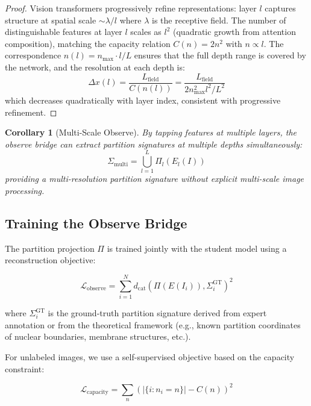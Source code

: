 \documentclass[11pt,twocolumn,a4paper]{article}
\newtheorem{corollary}[theorem]{Corollary}
\theoremstyle{definition}
\theoremstyle{remark}
\newcommand{\dcat}{d_{\mathrm{cat}}}
\newcommand{\Sig}{\Sigma}
\newcommand{\loss}{\mathcal{L}}
\begin{document}
\begin{proof}
Vision transformers progressively refine representations: layer $l$ captures structure at spatial scale $\sim \lambda / l$ where $\lambda$ is the receptive field. The number of distinguishable features at layer $l$ scales as $l^2$ (quadratic growth from attention composition), matching the capacity relation $C(n) = 2n^2$ with $n \propto l$. The correspondence $n(l) = n_{\max} \cdot l/L$ ensures that the full depth range is covered by the network, and the resolution at each depth is:
\begin{equation}
\Delta x(l) = \frac{L_{\text{field}}}{C(n(l))} = \frac{L_{\text{field}}}{2n_{\max}^2 l^2 / L^2}
\end{equation}
which decreases quadratically with layer index, consistent with progressive refinement.
\end{proof}

\begin{corollary}[Multi-Scale Observe]
By tapping features at multiple layers, the observe bridge can extract partition signatures at multiple depths simultaneously:
\begin{equation}
\Sig_{\text{multi}} = \bigcup_{l=1}^{L} \Pi_l(E_l(I))
\end{equation}
providing a multi-resolution partition signature without explicit multi-scale image processing.
\end{corollary}

\subsection{Training the Observe Bridge}

The partition projection $\Pi$ is trained jointly with the student model using a reconstruction objective:

\begin{equation}
\loss_{\text{observe}} = \sum_{i=1}^{N} \dcat(\Pi(E(I_i)), \Sig_i^{\text{GT}})^2
\end{equation}

where $\Sig_i^{\text{GT}}$ is the ground-truth partition signature derived from expert annotation or from the theoretical framework (e.g., known partition coordinates of nuclear boundaries, membrane structures, etc.).

For unlabeled images, we use a self-supervised objective based on the capacity constraint:

\begin{equation}
\loss_{\text{capacity}} = \sum_n \left(|\{i : n_i = n\}| - C(n)\right)^2
\end{equation}
\end{document}
